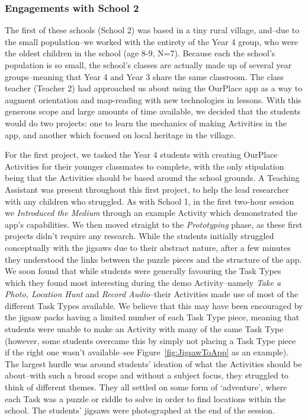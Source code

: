 \documentclass[,hyphens]{sigchi}
\begin{document}
\subsubsection{Engagements with School 2}
The first of these schools (School 2) was based in a tiny rural village, and--due to the small population--we worked with the entirety of the Year 4 group, who were the oldest children in the school (age 8-9, N=7). Because each the school's population is so small, the school's classes are actually made up of several year groups--meaning that Year 4 and Year 3 share the same classroom. The class teacher (Teacher 2) had approached us about using the OurPlace app as a way to augment orientation and map-reading with new technologies in lessons. With this generous scope and large amounts of time available, we decided that the students would do two projects: one to learn the mechanics of making Activities in the app, and another which focused on local heritage in the village. 

For the first project, we tasked the Year 4 students with creating OurPlace Activities for their younger classmates to complete, with the only stipulation being that the Activities should be based around the school grounds. A Teaching Assistant was present throughout this first project, to help the lead researcher with any children who struggled. As with School 1, in the first two-hour session we \textit{Introduced the Medium} through an example Activity which demonstrated the app's capabilities. We then moved straight to the \textit{Prototyping} phase, as these first projects didn't require any research. While the students initially struggled conceptually with the jigsaws due to their abstract nature, after a few minutes they understood the links between the puzzle pieces and the structure of the app. We soon found that while students were generally favouring the Task Types which they found most interesting during the demo Activity--namely \textit{Take a Photo, Location Hunt} and \textit{Record Audio}--their Activities made use of most of the different Task Types available. We believe that this may have been encouraged by the jigsaw packs having a limited number of each Task Type piece, meaning that students were unable to make an Activity with many of the same Task Type (however, some students overcame this by simply not placing a Task Type piece if the right one wasn't available--see Figure~\ref{fig:JigsawToApp} as an example). The largest hurdle was around students' ideation of what the Activities should be about--with such a broad scope and without a subject focus, they struggled to think of different themes. They all settled on some form of `adventure', where each Task was a puzzle or riddle to solve in order to find locations within the school. The students' jigsaws were photographed at the end of the session.
\end{document}
